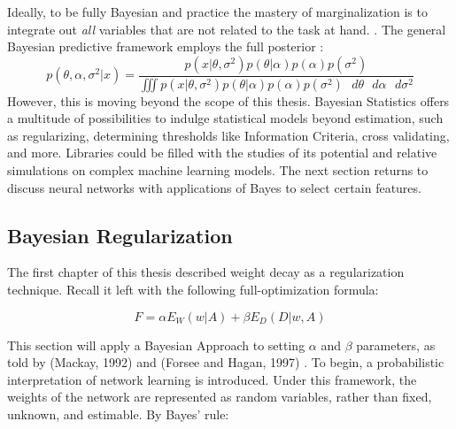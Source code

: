 
Ideally, to be fully Bayesian and practice the mastery of marginalization is to integrate out \textit{all} variables that are not related to the task at hand. \cite{bishop2006pattern}.  The general Bayesian predictive framework employs the full posterior \cite{tipping2004bayesian}:
$$
p(\theta,\alpha,\sigma^2|x) = \frac{p(x|\theta,\sigma^2) p(\theta|\alpha)p(\alpha)p(\sigma^2)}{\iiint p(x|\theta,\sigma^2)p(\theta|\alpha)p(\alpha)p(\sigma^2) \text{ } d\theta \text{ } d\alpha \text{ } d\sigma^2}
$$
However, this is moving beyond the scope of this thesis.  Bayesian Statistics offers a multitude of possibilities to indulge statistical models beyond estimation, such as regularizing, determining thresholds like Information Criteria, cross validating, and more.  Libraries could be filled with the studies of its potential and relative simulations on complex machine learning models.  The next section returns to discuss neural networks with applications of Bayes to select certain features.

\begin{comment}
\subsection{Predictive Accuracy Measures}
I feel I need to put Bayes-CV somewhere...

Mention of their frequentist analog (for lppd is is the log-probability score on Rethinking p. 214)

\textbf{Bayesian Cross-Validation} to get the log-pointwise predictive density
$$
lppd_{CV} = \sum_{i=1}^N \frac{1}{S} \sum_{s=1}^S logP(w_i|\theta_{-i,s})
$$

\textbf{Information Criteria} also found in Rethinking (p. 223) and BDA (p. 169)
\end{comment}

\subsection{Bayesian Regularization}


The first chapter of this thesis described weight decay as a regularization technique.  Recall it left with the following full-optimization formula:

$$
F = \alpha E_W(w|A) + \beta E_D(D|w,A)
$$



This section will apply a Bayesian Approach to setting $\alpha$ and $\beta$ parameters, as told by (Mackay, 1992) \cite{mackay1992practical} and (Forsee and Hagan, 1997) \cite{foresee1997gauss}.  To begin, a probabilistic interpretation of network learning \cite{mackay1992practical} is introduced.  Under this framework, the weights of the network are represented as random variables, rather than fixed, unknown, and estimable.  By Bayes' rule:
 
